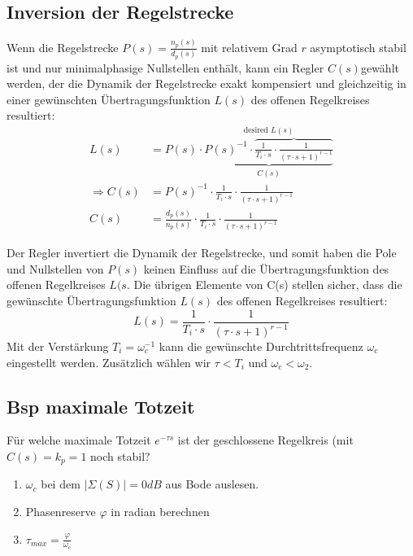     \subsection{Inversion der Regelstrecke}
        Wenn die Regelstrecke $P(s) = \frac{n_p(s)}{d_p(s)}$ mit relativem Grad $r$ asymptotisch stabil ist und nur minimalphasige Nullstellen enthält, kann ein Regler $C(s)$gewählt werden, der die Dynamik der Regelstrecke exakt kompensiert und gleichzeitig in einer gewünschten Übertragungsfunktion $L(s)$ des offenen Regelkreises resultiert:
        \begin{align*}
            L(s) &= P(s)\cdot \underbrace{P(s)^{-1}\cdot\overbrace{\frac{1}{T_i\cdot s}\cdot\frac{1}{(\tau\cdot s + 1)^{r-1}}}}^{\textrm{desired }L(s)}_{C(s)}\\
            \Rightarrow C(s) &= P(s)^{-1}\cdot\frac{1}{T_i\cdot s}\cdot\frac{1}{(\tau\cdot s + 1)^{r-1}}\\
            C(s) &= \frac{d_p(s)}{n_p(s)}\cdot\frac{1}{T_i\cdot s}\cdot\frac{1}{(\tau\cdot s + 1)^{r-1}}
            \end{align*}
            
        Der Regler invertiert die Dynamik der Regelstrecke, und somit haben die Pole und Nullstellen von $P(s)$ keinen Einfluss auf die Übertragungsfunktion des offenen Regelkreises $L(s$. Die übrigen Elemente von C(s) stellen sicher, dass die gewünschte Übertragungsfunktion $L(s)$ des offenen Regelkreises resultiert:
        \[L(s) = \frac{1}{T_i\cdot s}\cdot \frac{1}{(\tau\cdot s + 1)^{r-1}}\]
        Mit der Verstärkung $T_i = \omega_c^{-1}$ kann die gewünschte Durchtrittsfrequenz $\omega_c$ eingestellt werden. Zusätzlich wählen wir $\tau < T_i$ und $\omega_c < \omega_2$.
        
    \subsection{Bsp maximale Totzeit}
        Für welche maximale Totzeit $e^{-\tau s}$ ist der geschlossene Regelkreis (mit $C(s)=k_p=1$ noch stabil?
        \begin{enumerate}
            \item $\omega_c$ bei dem $|\Sigma(S)|=0 dB$ aus Bode auslesen.
            \item Phasenreserve $\varphi$ in radian berechnen
            \item $\tau_{max}=\frac{\varphi}{\omega_c}$
        \end{enumerate}